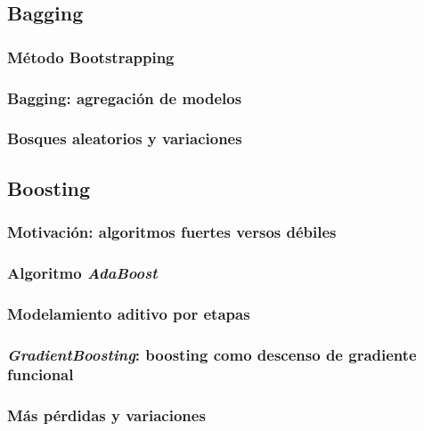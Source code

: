 \subsection{Bagging}
\label{sec:bagging}

\subsubsection{Método Bootstrapping}

\subsubsection{Bagging: agregación de modelos}

\subsubsection{Bosques aleatorios y variaciones}


\subsection{Boosting}
\label{sec:boosting}

\subsubsection{Motivación: algoritmos fuertes versos débiles}

\subsubsection{Algoritmo \textit{AdaBoost}}

\subsubsection{Modelamiento aditivo por etapas}

\subsubsection{\textit{GradientBoosting}: boosting como descenso de gradiente funcional}

\subsubsection{Más pérdidas y variaciones}
